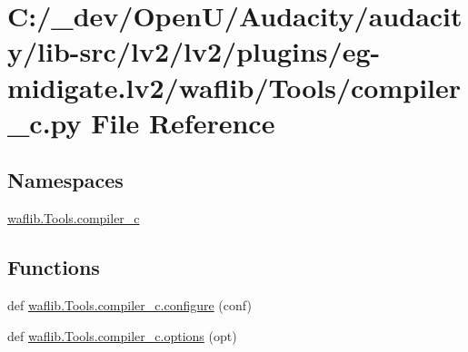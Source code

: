 \hypertarget{lv2_2plugins_2eg-midigate_8lv2_2waflib_2_tools_2compiler__c_8py}{}\section{C\+:/\+\_\+dev/\+Open\+U/\+Audacity/audacity/lib-\/src/lv2/lv2/plugins/eg-\/midigate.lv2/waflib/\+Tools/compiler\+\_\+c.py File Reference}
\label{lv2_2plugins_2eg-midigate_8lv2_2waflib_2_tools_2compiler__c_8py}
\subsection*{Namespaces}
\begin{DoxyCompactItemize}
\item 
 \hyperlink{namespacewaflib_1_1_tools_1_1compiler__c}{waflib.\+Tools.\+compiler\+\_\+c}
\end{DoxyCompactItemize}
\subsection*{Functions}
\begin{DoxyCompactItemize}
\item 
def \hyperlink{namespacewaflib_1_1_tools_1_1compiler__c_a21492d9277532807d6c9af80d07ab9cd}{waflib.\+Tools.\+compiler\+\_\+c.\+configure} (conf)
\item 
def \hyperlink{namespacewaflib_1_1_tools_1_1compiler__c_a3700f55375e0ba3c634ddfe42b019667}{waflib.\+Tools.\+compiler\+\_\+c.\+options} (opt)
\end{DoxyCompactItemize}
